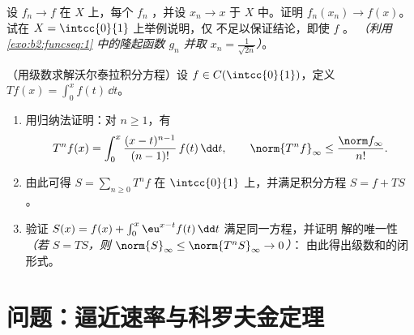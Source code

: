 \begin{exercise}[$\star\star$]\label{exo:b2:funcseq:11}
设 $f_n \to f$ 在 $X$ 上，每个 $f_n$
，并设 $x_n \to x$ 于 $X$ 中。证明 $f_n(x_n) \to
f(x)$。试在 $X = \intcc{0}{1}$ 上举例说明，仅
不足以保证结论，即使 $f$ 。
\emph{（利用 \cref{exo:b2:funcseq:1} 中的隆起函数 $g_n$ 并取 $x_n =
\frac{1}{\sqrt{2n}}$）}。
\end{exercise}

\begin{exercise}[$\star\star\star$]\label{exo:b2:funcseq:12}
（用级数求解沃尔泰拉积分方程）设 $f \in
C(\intcc{0}{1})$，定义 $Tf(x) = \int_0^x f(t)\,\dd t$。
\begin{enumerate}
  \item 用归纳法证明：对 $n \geq 1$，有
        \[
        T^n f(x) = \int_0^x \frac{(x -
        t)^{n-1}}{(n-1)!}\,f(t)\,\dd t,
        \qquad
        \norm{T^n f}_\infty \leq \frac{\norm f_\infty}{n!} .
        \]
  \item 由此可得 $S = \sum_{n\geq0} T^n f$ 在
        $\intcc{0}{1}$ 上，并满足积分方程 $S = f
        + TS$。
  \item 验证 $S(x) = f(x) + \int_0^x \eu^{x-t}f(t)\,\dd
        t$ 满足同一方程，并证明
        解的唯一性 \emph{（若 $S = TS$，则
        $\norm{S}_\infty \leq \norm{T^nS}_\infty \to 0$）}：
        由此得出级数和的闭形式。
\end{enumerate}
\end{exercise}

\section{问题：逼近速率与科罗夫金定理}

